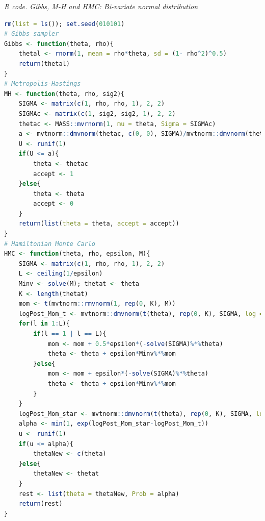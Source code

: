 \begin{tcolorbox}[enhanced,width=4.67in,center upper,
	fontupper=\large\bfseries,drop shadow southwest,sharp corners]
	\textit{R code. Gibbs, M-H and HMC: Bi-variate normal distribution}
	\begin{VF}
		\begin{lstlisting}[language=R]
rm(list = ls()); set.seed(010101)
# Gibbs sampler
Gibbs <- function(theta, rho){
	thetal <- rnorm(1, mean = rho*theta, sd = (1- rho^2)^0.5)
	return(thetal)
}
# Metropolis-Hastings
MH <- function(theta, rho, sig2){
	SIGMA <- matrix(c(1, rho, rho, 1), 2, 2)
	SIGMAc <- matrix(c(1, sig2, sig2, 1), 2, 2)
	thetac <- MASS::mvrnorm(1, mu = theta, Sigma = SIGMAc)
	a <- mvtnorm::dmvnorm(thetac, c(0, 0), SIGMA)/mvtnorm::dmvnorm(theta, c(0, 0), SIGMA)
	U <- runif(1)
	if(U <= a){
		theta <- thetac
		accept <- 1
	}else{
		theta <- theta
		accept <- 0
	}
	return(list(theta = theta, accept = accept))
}
# Hamiltonian Monte Carlo
HMC <- function(theta, rho, epsilon, M){
	SIGMA <- matrix(c(1, rho, rho, 1), 2, 2) 
	L <- ceiling(1/epsilon)
	Minv <- solve(M); thetat <- theta
	K <- length(thetat)
	mom <- t(mvtnorm::rmvnorm(1, rep(0, K), M))
	logPost_Mom_t <- mvtnorm::dmvnorm(t(theta), rep(0, K), SIGMA, log = TRUE) +  mvtnorm::dmvnorm(t(mom), rep(0, K), M, log = TRUE)  
	for(l in 1:L){
		if(l == 1 | l == L){
			mom <- mom + 0.5*epsilon*(-solve(SIGMA)%*%theta)
			theta <- theta + epsilon*Minv%*%mom
		}else{
			mom <- mom + epsilon*(-solve(SIGMA)%*%theta)
			theta <- theta + epsilon*Minv%*%mom
		}
	}
	logPost_Mom_star <- mvtnorm::dmvnorm(t(theta), rep(0, K), SIGMA, log = TRUE) +  mvtnorm::dmvnorm(t(mom), rep(0, K), M, log = TRUE)  
	alpha <- min(1, exp(logPost_Mom_star-logPost_Mom_t))
	u <- runif(1)
	if(u <= alpha){
		thetaNew <- c(theta)
	}else{
		thetaNew <- thetat
	}
	rest <- list(theta = thetaNew, Prob = alpha)
	return(rest)
}
\end{lstlisting}
	\end{VF}
\end{tcolorbox} 


